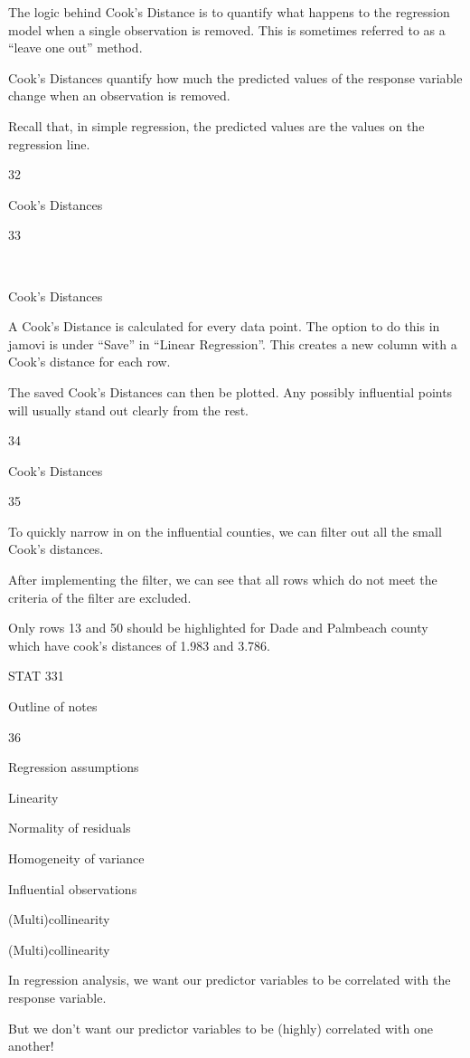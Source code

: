 \documentclass[
  letterpaper,
  DIV=11,
  numbers=noendperiod]{scrreprt}
\begin{document}
The logic behind Cook's Distance is to quantify what happens to the
regression model when a single observation is removed. This is sometimes
referred to as a ``leave one out'' method.

Cook's Distances quantify how much the predicted values of the response
variable change when an observation is removed.

Recall that, in simple regression, the predicted values are the values
on the regression line.

32

Cook's Distances

33

~

Cook's Distances

A Cook's Distance is calculated for every data point. The option to do
this in jamovi is under ``Save'' in ``Linear Regression''. This creates
a new column with a Cook's distance for each row.

The saved Cook's Distances can then be plotted. Any possibly influential
points will usually stand out clearly from the rest.

34

Cook's Distances

35

To quickly narrow in on the influential counties, we can filter out all
the small Cook's distances.

After implementing the filter, we can see that all rows which do not
meet the criteria of the filter are excluded.

Only rows 13 and 50 should be highlighted for Dade and Palmbeach county
which have cook's distances of 1.983 and 3.786.

STAT 331

Outline of notes

36

Regression assumptions

Linearity

Normality of residuals

Homogeneity of variance

Influential observations

(Multi)collinearity

(Multi)collinearity

In regression analysis, we want our predictor variables to be correlated
with the response variable.

But we don't want our predictor variables to be (highly) correlated with
one another!
\end{document}
